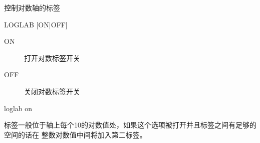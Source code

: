 \label{cmd:loglab}

控制对数轴的标签

\begin{SACSTX}
LOGLAB [ON|OFF]
\end{SACSTX}

\begin{description}
\item [ON] 打开对数标签开关 
\item [OFF] 关闭对数标签开关 
\end{description}

\begin{SACDFT}
loglab on
\end{SACDFT}

标签一般位于轴上每个10的对数值处，如果这个选项被打开并且标签之间有足够的空间的话在
整数对数值中间将加入第二标签。
